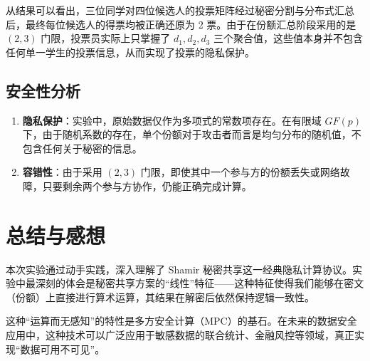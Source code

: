 \documentclass[a4paper]{article}
\begin{document}
从结果可以看出，三位同学对四位候选人的投票矩阵经过秘密分割与分布式汇总后，最终每位候选人的得票均被正确还原为 2 票。由于在份额汇总阶段采用的是 $(2,3)$ 门限，投票员实际上只掌握了 $d_1,d_2,d_3$ 三个聚合值，这些值本身并不包含任何单一学生的投票信息，从而实现了投票的隐私保护。

\subsection{安全性分析}
\begin{enumerate}
    \item \textbf{隐私保护}：实验中，原始数据仅作为多项式的常数项存在。在有限域 $GF(p)$ 下，由于随机系数的存在，单个份额对于攻击者而言是均匀分布的随机值，不包含任何关于秘密的信息。
    \item \textbf{容错性}：由于采用 $(2,3)$ 门限，即使其中一个参与方的份额丢失或网络故障，只要剩余两个参与方协作，仍能正确完成计算。
\end{enumerate}

\section{总结与感想}
本次实验通过动手实践，深入理解了 Shamir 秘密共享这一经典隐私计算协议。实验中最深刻的体会是秘密共享方案的“线性”特征——这种特征使得我们能够在密文（份额）上直接进行算术运算，其结果在解密后依然保持逻辑一致性。

这种“运算而无感知”的特性是多方安全计算（MPC）的基石。在未来的数据安全应用中，这种技术可以广泛应用于敏感数据的联合统计、金融风控等领域，真正实现“数据可用不可见”。
\end{document}
